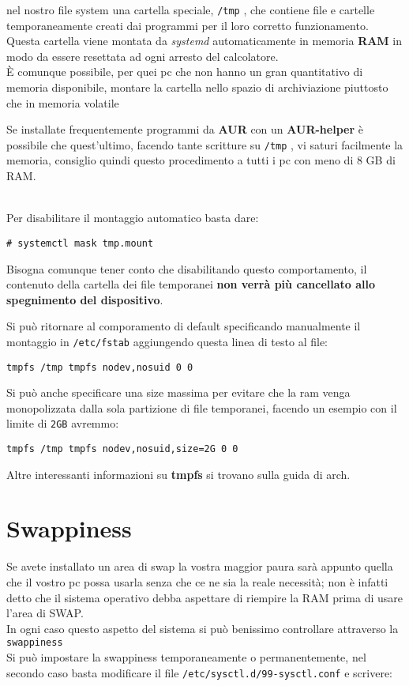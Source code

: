 \documentclass[twoside,italian]{book}
\newcommand{\nlinea}{
	\leavevmode
	\\
}
\newcommand{\centcode}[1]{
	
	\definecolor{centcode}{rgb}{0.5,0.1,0.1}
	
	\begin{center}
	 	\texttt{\textcolor{centcode}{#1}}
	\end{center}
	
	
}
\newcommand{\code}[1]{
	\texttt{\textcolor{code}{#1}}
}
\begin{document}
			nel nostro file system una cartella speciale, \code{/tmp}, che contiene file e cartelle temporaneamente creati dai programmi per il loro corretto funzionamento. Questa cartella viene montata da \textit{systemd} automaticamente in memoria \textbf{RAM } in modo da essere resettata ad ogni arresto del calcolatore.\\
			È comunque possibile, per quei pc che non hanno un gran quantitativo di memoria disponibile, montare la cartella nello spazio di archiviazione piuttosto che in memoria volatile
			
			\begin{tcolorbox}[floatplacement=b,width=\textwidth,colback={white},title={ATTENZIONE:},colbacktitle=red,coltitle=white,colupper=red]
				Se installate frequentemente programmi da \textbf{AUR} con un \textbf{AUR-helper} è possibile che quest'ultimo, facendo tante scritture su \code{/tmp}, vi saturi facilmente la memoria, consiglio quindi questo procedimento a tutti i pc con meno di 8 GB di RAM.
			\end{tcolorbox}
			\nlinea
			Per disabilitare il montaggio automatico basta dare:
			\centcode{\# systemctl mask tmp.mount}
			
			Bisogna comunque tener conto che disabilitando questo comportamento, il contenuto della cartella dei file temporanei \textbf{non verrà più cancellato allo spegnimento del dispositivo}.
			
			Si può ritornare al comporamento di default specificando manualmente il montaggio in \code{/etc/fstab} aggiungendo questa linea di testo al file:
			\centcode{tmpfs   /tmp         tmpfs   nodev,nosuid          0  0}
			
			Si può anche specificare una size massima per evitare che la ram venga monopolizzata dalla sola partizione di file temporanei, facendo un esempio con il limite di \code{2GB} avremmo:
			\centcode{tmpfs   /tmp         tmpfs   nodev,nosuid,size=2G          0  0}
			
			Altre interessanti informazioni su \textbf{tmpfs} si trovano sulla guida di arch.
				
			
		\section{Swappiness}
			
			Se avete installato un area di swap la vostra maggior paura sarà appunto quella che il vostro pc possa usarla senza che ce ne sia la reale necessità; non è infatti detto che il sistema operativo debba aspettare di riempire la RAM prima di usare l'area di SWAP.\\
			In ogni caso questo aspetto del sistema si può benissimo controllare attraverso la \code{swappiness}\\
			Si può impostare la swappiness temporaneamente o permanentemente, nel secondo caso basta modificare il file \code{/etc/sysctl.d/99-sysctl.conf} e scrivere:
			
\end{document}
